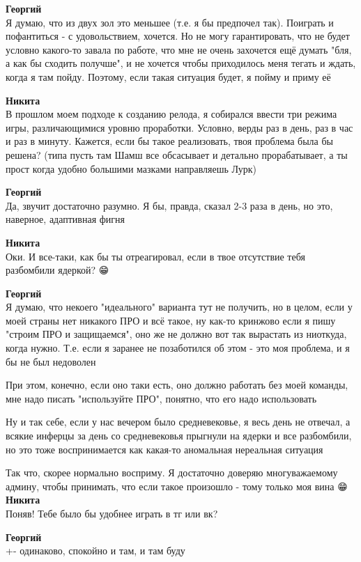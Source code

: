 \begin{tabbing}
\textbf{Георгий} \\
Я думаю, что из двух зол это меньшее (т.е. я бы предпочел так). Поиграть и пофантиться - с удовольствием, хочется. Но не могу гарантировать, что не будет условно какого-то завала по работе, что мне не очень захочется ещё думать "бля, а как бы сходить получше", и не хочется чтобы приходилось меня тегать и ждать, когда я там пойду. Поэтому, если такая ситуация будет, я пойму и приму её

\textbf{Никита} \\
В прошлом моем подходе к созданию релода, я собирался ввести три режима игры, различающимися уровню проработки. Условно, верды раз в день, раз в час и раз в минуту.
Кажется, если бы такое реализовать, твоя проблема была бы решена? (типа пусть там Шамш все обсасывает и детально прорабатывает, а ты прост когда удобно большими мазками направляешь Лурк)

\textbf{Георгий} \\
Да, звучит достаточно разумно. Я бы, правда, сказал 2-3 раза в день, но это, наверное, адаптивная фигня

\textbf{Никита} \\
Оки. И все-таки, как бы ты отреагировал, если в твое отсутствие тебя разбомбили ядеркой? 😁🎅

\textbf{Георгий} \\
Я думаю, что некоего "идеального" варианта тут не получить, но в целом, если у моей страны нет никакого ПРО и всё такое, ну как-то кринжово если я пишу "строим ПРО и защищаемся", оно же не должно вот так вырастать из ниоткуда, когда нужно. Т.е. если я заранее не позаботился об этом - это моя проблема, и я бы не был недоволен

При этом, конечно, если оно таки есть, оно должно работать без моей команды, мне надо писать "используйте ПРО", понятно, что его надо использовать

Ну и так себе, если у нас вечером было средневековье, я весь день не отвечал, а всякие инферцы за день со средневековья прыгнули на ядерки и все разбомбили, но это тоже воспринимается как какая-то аномальная нереальная ситуация

Так что, скорее нормально восприму. Я достаточно доверяю многуважаемому админу, чтобы принимать, что если такое произошло - тому только моя вина 😁🙏
\textbf{Никита} \\
Поняв! Тебе было бы удобнее играть в тг или вк?

\textbf{Георгий} \\
+- одинаково, спокойно и там, и там буду


\end{tabbing}
